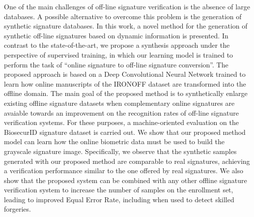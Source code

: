 \setlength{\absparsep}{18pt} %
\begin{resumo}
One of the main challenges of off-line signature verification is the absence of large databases. A possible alternative to overcome this problem is the generation of synthetic signature databases. In this work, a novel method for the generation of synthetic off-line signatures based on dynamic information is presented. In contrast to the state-of-the-art, we propose a synthesis approach under the perspective of supervised training, in which our learning model is trained to perform the task of ``online signature to off-line signature conversion''. The proposed approach is based on a Deep Convolutional Neural Network trained to learn how online manuscripts of the IRONOFF dataset are transformed into the offline domain. The main goal of the proposed method is to synthetically enlarge existing offline signature datasets when complementary online signatures are avaiable towards an improvement on the recognition rates of off-line signature verification systems. For these purposes, a machine-oriented evaluation on the BiosecurID signature dataset is carried out. We show that our proposed method model can learn how the online biometric data must be used to build the grayscale signature image. Specifically, we observe that the synthetic samples generated with our proposed method are comparable to real signatures, achieving a verification performance similar to the one offered by real signatures. We also show that the proposed system can be combined with any other offline signature verification system to increase the number of samples on the enrollment set, leading to improved Equal Error Rate, including when used to detect skilled forgeries.
\end{resumo}

